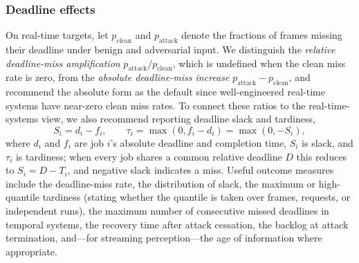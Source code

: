 \documentclass[acmsmall,screen,review,nonacm]{acmart}
\begin{document}
\subsubsection{Deadline effects}
On real-time targets, let $p_{\text{clean}}$ and $p_{\text{attack}}$ denote the fractions of frames missing their deadline under benign and adversarial input. We distinguish the \emph{relative deadline-miss amplification} $p_{\text{attack}}/p_{\text{clean}}$, which is undefined when the clean miss rate is zero, from the \emph{absolute deadline-miss increase} $p_{\text{attack}}-p_{\text{clean}}$, and recommend the absolute form as the default since well-engineered real-time systems have near-zero clean miss rates. To connect these ratios to the real-time-systems view, we also recommend reporting deadline slack and tardiness,
\begin{equation}
S_i = d_i - f_i, \qquad \tau_i = \max(0, f_i - d_i) = \max(0, -S_i),
\end{equation}
where $d_i$ and $f_i$ are job $i$'s absolute deadline and completion time, $S_i$ is slack, and $\tau_i$ is tardiness; when every job shares a common relative deadline $D$ this reduces to $S_i = D - T_i$, and negative slack indicates a miss. Useful outcome measures include the deadline-miss rate, the distribution of slack, the maximum or high-quantile tardiness (stating whether the quantile is taken over frames, requests, or independent runs), the maximum number of consecutive missed deadlines in temporal systems, the recovery time after attack cessation, the backlog at attack termination, and---for streaming perception---the age of information where appropriate.
\end{document}
